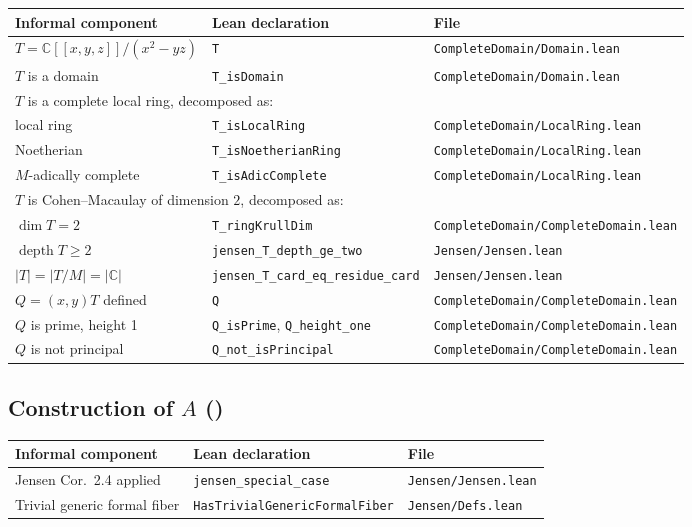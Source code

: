 \documentclass[]{pkuai4m}
\theoremstyle{plain}
\theoremstyle{definition}
\begin{document}
\begin{center}
\footnotesize
\begin{tabular}{p{5.5cm} l l}
\toprule
\textbf{Informal component} & \textbf{Lean declaration} & \textbf{File} \\
\midrule
$T = \mathbb{C}[[x,y,z]]/(x^2-yz)$ & \texttt{T} & \texttt{CompleteDomain/Domain.lean} \\
$T$ is a domain & \texttt{T\_isDomain} & \texttt{CompleteDomain/Domain.lean} \\
\multicolumn{3}{l}{$T$ is a complete local ring, decomposed as:} \\
\quad local ring & \texttt{T\_isLocalRing} & \texttt{CompleteDomain/LocalRing.lean} \\
\quad Noetherian & \texttt{T\_isNoetherianRing} & \texttt{CompleteDomain/LocalRing.lean} \\
\quad $M$-adically complete & \texttt{T\_isAdicComplete} & \texttt{CompleteDomain/LocalRing.lean} \\
\multicolumn{3}{l}{$T$ is Cohen--Macaulay of dimension $2$, decomposed as:} \\
\quad $\dim T = 2$ & \texttt{T\_ringKrullDim} & \texttt{CompleteDomain/CompleteDomain.lean} \\
\quad $\operatorname{depth} T \ge 2$ & \texttt{jensen\_T\_depth\_ge\_two} & \texttt{Jensen/Jensen.lean} \\
$|T| = |T/M| = |\mathbb{C}|$ & \texttt{jensen\_T\_card\_eq\_residue\_card} & \texttt{Jensen/Jensen.lean} \\
$Q = (x,y)T$ defined & \texttt{Q} & \texttt{CompleteDomain/CompleteDomain.lean} \\
$Q$ is prime, height 1 & \texttt{Q\_isPrime}, \texttt{Q\_height\_one} & \texttt{CompleteDomain/CompleteDomain.lean} \\
$Q$ is not principal & \texttt{Q\_not\_isPrincipal} & \texttt{CompleteDomain/CompleteDomain.lean} \\
\bottomrule
\end{tabular}
\end{center}

\subsection*{Construction of $A$ ()}

\begin{center}
\small
\begin{tabular}{p{5.5cm} l l}
\toprule
\textbf{Informal component} & \textbf{Lean declaration} & \textbf{File} \\
\midrule
Jensen Cor.~2.4 applied & \texttt{jensen\_special\_case} & \texttt{Jensen/Jensen.lean} \\
Trivial generic formal fiber & \texttt{HasTrivialGenericFormalFiber} & \texttt{Jensen/Defs.lean} \\
\bottomrule
\end{tabular}
\end{center}
\end{document}
